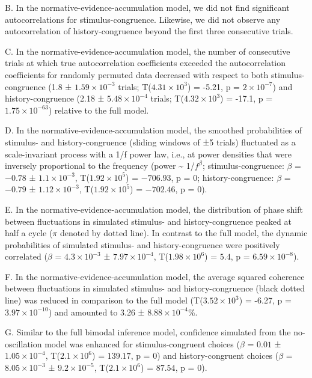 \documentclass[
]{article}
\begin{document}
B. In the normative-evidence-accumulation model, we did not find
significant autocorrelations for stimulus-congruence. Likewise, we did
not observe any autocorrelation of history-congruence beyond the first
three consecutive trials.

C. In the normative-evidence-accumulation model, the number of
consecutive trials at which true autocorrelation coefficients exceeded
the autocorrelation coefficients for randomly permuted data decreased
with respect to both stimulus-congruence (1.8 ±
\ensuremath{1.59\times 10^{-3}} trials;
T(\ensuremath{4.31\times 10^{3}}) = -5.21, p =
\(\ensuremath{2\times 10^{-7}}\)) and history-congruence (2.18 ±
\ensuremath{5.48\times 10^{-4}} trials;
T(\ensuremath{4.32\times 10^{3}}) = -17.1, p =
\(\ensuremath{1.75\times 10^{-63}}\)) relative to the full model.

D. In the normative-evidence-accumulation model, the smoothed
probabilities of stimulus- and history-congruence (sliding windows of ±5
trials) fluctuated as a scale-invariant process with a 1/f power law,
i.e., at power densities that were inversely proportional to the
frequency (power \textasciitilde{} 1/\(f^\beta\); stimulus-congruence:
\(\beta\) = \(-0.78\) ± \(\ensuremath{1.1\times 10^{-3}}\),
T(\(\ensuremath{1.92\times 10^{5}}\)) = \(-706.93\), p = \(0\);
history-congruence: \(\beta\) = \(-0.79\) ±
\(\ensuremath{1.12\times 10^{-3}}\),
T(\(\ensuremath{1.92\times 10^{5}}\)) = \(-702.46\), p = \(0\)).

E. In the normative-evidence-accumulation model, the distribution of
phase shift between fluctuations in simulated stimulus- and
history-congruence peaked at half a cycle (\(\pi\) denoted by dotted
line). In contrast to the full model, the dynamic probabilities of
simulated stimulus- and history-congruence were positively correlated
(\(\beta\) = \(\ensuremath{4.3\times 10^{-3}}\) ±
\(\ensuremath{7.97\times 10^{-4}}\),
T(\(\ensuremath{1.98\times 10^{6}}\)) = \(5.4\), p =
\(\ensuremath{6.59\times 10^{-8}}\)).

F. In the normative-evidence-accumulation model, the average squared
coherence between fluctuations in simulated stimulus- and
history-congruence (black dotted line) was reduced in comparison to the
full model (T(\ensuremath{3.52\times 10^{3}}) = -6.27, p =
\(\ensuremath{3.97\times 10^{-10}}\)) and amounted to 3.26 ±
\ensuremath{8.88\times 10^{-4}}\%.

G. Similar to the full bimodal inference model, confidence simulated
from the no-oscillation model was enhanced for stimulus-congruent
choices (\(\beta\) = \(0.01\) ± \(\ensuremath{1.05\times 10^{-4}}\),
T(\(\ensuremath{2.1\times 10^{6}}\)) = \(139.17\), p = \(0\)) and
history-congruent choices (\(\beta\) =
\(\ensuremath{8.05\times 10^{-3}}\) ±
\(\ensuremath{9.2\times 10^{-5}}\), T(\(\ensuremath{2.1\times 10^{6}}\))
= \(87.54\), p = \(0\)).
\end{document}
